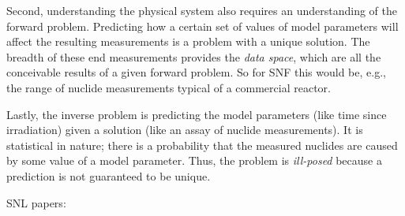 Second, understanding the physical system also requires an understanding of the
forward problem. Predicting how a certain set of values of model parameters
will affect the resulting measurements is a problem with a unique solution.
The breadth of these end measurements provides the \textit{data space}, which
are all the conceivable results of a given forward problem. So for \gls{SNF}
this would be, e.g., the range of nuclide measurements typical of a commercial
reactor. 

Lastly, the inverse problem is predicting the model parameters (like time since
irradiation) given a solution (like an assay of nuclide measurements).  It is
statistical in nature; there is a probability that the measured nuclides are
caused by some value of a model parameter. Thus, the problem is
\textit{ill-posed} because a prediction is not guaranteed to be unique. 


SNL papers:
\cite{inverse_select}
\cite{inverse_compare}

%


